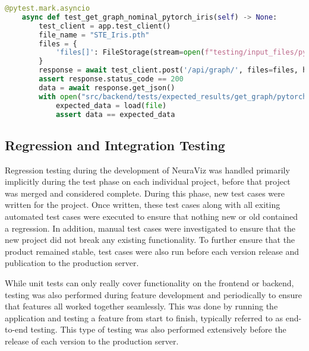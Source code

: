 \begin{center}
    \begin{lstlisting}[language=Python, float=*htb, caption={Pytest Test Case Example}, label={lst:pytest-example}]
    @pytest.mark.asyncio
    async def test_get_graph_nominal_pytorch_iris(self) -> None:
        test_client = app.test_client()
        file_name = "STE_Iris.pth"
        files = {
            'files[]': FileStorage(stream=open(f"testing/input_files/pytorch/{file_name}", 'rb'), filename=file_name)
        }
        response = await test_client.post('/api/graph/', files=files, headers={'Content-Type': 'multipart/form-data'})
        assert response.status_code == 200
        data = await response.get_json()
        with open("src/backend/tests/expected_results/get_graph/pytorch/nominal_STE_Iris.json", 'r') as file:
            expected_data = load(file)
            assert data == expected_data
    \end{lstlisting}
\end{center}

\subsection{Regression and Integration Testing}
Regression testing during the development of NeuraViz was handled primarily implicitly during the test phase on each individual project, before that project was merged and considered complete. During this phase, new test cases were written for the project. Once written, these test cases along with all exiting automated test cases were executed to ensure that nothing new or old contained a regression. In addition, manual test cases were investigated to ensure that the new project did not break any existing functionality. To further ensure that the product remained stable, test cases were also run before each version release and publication to the production server.  

While unit tests can only really cover functionality on the frontend or backend, testing was also performed during feature development and periodically to ensure that features all worked together seamlessly. This was done by running the application and testing a feature from start to finish, typically referred to as end-to-end testing. This type of testing was also performed extensively before the release of each version to the production server.